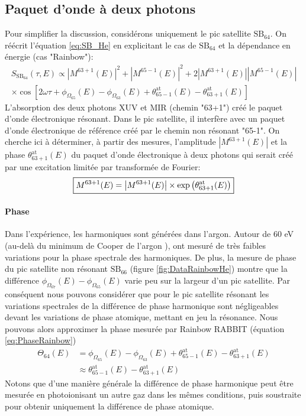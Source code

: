 \subsection{Paquet d'onde à deux photons}
\label{subsec:POE_2phot_spec}
Pour simplifier la discussion, considérons uniquement le pic satellite $\text{SB}_{64}$. On réécrit l'équation \ref{eq:SB_He} en explicitant le cas de $\text{SB}_{64}$ et la dépendance en énergie (cas "Rainbow"):
\begin{multline}
S_{\text{SB}_{64}}(\tau,E) \propto \left| M^{63+1}(E)\right|^2 + \left| M^{65-1}(E)\right|^2 + 2 \left| M^{63+1}(E)\right| \left| M^{65-1}(E)\right| \\ \times \cos[2 \omega \tau + \phi_{\Omega_{65}}(E) - \phi_{\Omega_{63}}(E) + \theta^{\text{at}}_{65-1}(E) - \theta^{\text{at}}_{63+1}(E)]
\end{multline}
L'absorption des deux photons XUV et MIR (chemin "63+1") créé le paquet d'onde électronique résonant. Dans le pic satellite, il interfère avec un paquet d'onde électronique de référence créé par le chemin non résonant "65-1". On cherche ici à déterminer, à partir des mesures, l'amplitude $\left| M^{63+1}(E)\right|$ et la phase $\theta^{\text{at}}_{63+1}(E)$ du paquet d'onde électronique à deux photons qui serait créé par une excitation limitée par transformée de Fourier:
\begin{equation}
\setlength\fboxrule{0.5pt}
\boxed{
M^{63+1}(E) = \left| M^{63+1}(E)\right| \times \mathrm{exp} \left( \theta^{\text{at}}_{63+1}(E) \right)
}
\end{equation}

\paragraph*{Phase} Dans l'expérience, les harmoniques sont générées dans l'argon. Autour de 60 eV (au-delà du minimum de Cooper de l'argon ),  ont mesuré de très faibles variations pour la phase spectrale des harmoniques. De plus, la mesure de phase du pic satellite non résonant $\text{SB}_{66}$ (figure \ref{fig:DataRainbowHe}) montre que la différence $\phi_{\Omega_{67}}(E) - \phi_{\Omega_{65}}(E)$ varie peu sur la largeur d'un pic satellite. Par conséquent nous pouvons considérer que pour le pic satellite résonant les variations spectrales de la différence de phase harmonique sont négligeables devant les variations de phase atomique, mettant en jeu la résonance. Nous pouvons alors approximer la phase mesurée par Rainbow RABBIT (équation \ref{eq:PhaseRainbow})
\begin{align}
\Theta_{64} (E) & = \phi_{\Omega_{65}}(E) - \phi_{\Omega_{63}}(E) + \theta^{\text{at}}_{65-1}(E) - \theta^{\text{at}}_{63+1}(E) \\
& \approx \theta^{\text{at}}_{65-1}(E) - \theta^{\text{at}}_{63+1}(E)
\end{align}
Notons que d'une manière générale la différence de phase harmonique peut être mesurée en photoionisant un autre gaz dans les mêmes conditions, puis soustraite pour obtenir uniquement la différence de phase atomique. 

